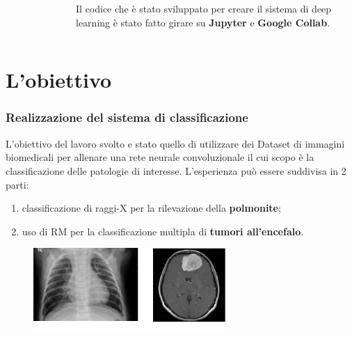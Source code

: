 \documentclass{beamer}
\begin{document}
\begin{frame}
\begin{columns}
\begin{figure}
		\end{figure}
		\bigskip

		
		\centering
		Il codice che è stato sviluppato per creare il sistema di deep learning è stato fatto girare su \textbf{Jupyter} e \textbf{Google Collab}.
		\bigskip\bigskip\bigskip
		
	\end{columns}
	
\end{frame}


\section{L'obiettivo}
\begin{frame}
	\frametitle{Realizzazione del sistema di classificazione}
	L’obiettivo del lavoro svolto e stato quello di utilizzare dei Dataset di immagini
	biomedicali per allenare una rete neurale convoluzionale il cui scopo è la
	classificazione delle patologie di interesse.
	L'esperienza può essere suddivisa in 2 parti:
	\begin{enumerate}
		\item classificazione di raggi-X per la rilevazione della \textbf{polmonite};
		\item uso di RM per la classificazione multipla di \textbf{tumori all'encefalo}.
	\end{enumerate}
	\begin{figure}
		\includegraphics[width=0.65\textwidth]{virus.JPEG}
		
	\end{figure}


	
\end{frame}
\end{document}
